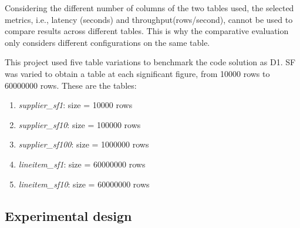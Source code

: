 Considering the different number of columns of the two tables used, the selected metrics, i.e., latency (seconds) and throughput(rows/second), cannot be used to compare results across different tables. This is why the comparative evaluation only considers different configurations on the same table.

This project used five table variations to benchmark the code solution as D1. \gls{SF} was varied to obtain a table at each significant figure, from 10000 rows to 60000000 rows. These are the tables:
\begin{enumerate}
    \item \textit{supplier\_sf1}: size = 10000 rows
    \item \textit{supplier\_sf10}: size = 100000 rows
    \item \textit{supplier\_sf100}: size = 1000000 rows
    \item \textit{lineitem\_sf1}: size = 60000000 rows
    \item \textit{lineitem\_sf10}: size = 60000000 rows
\end{enumerate}

\subsection{Experimental design}
\label{subsec:experimental_design}
%

